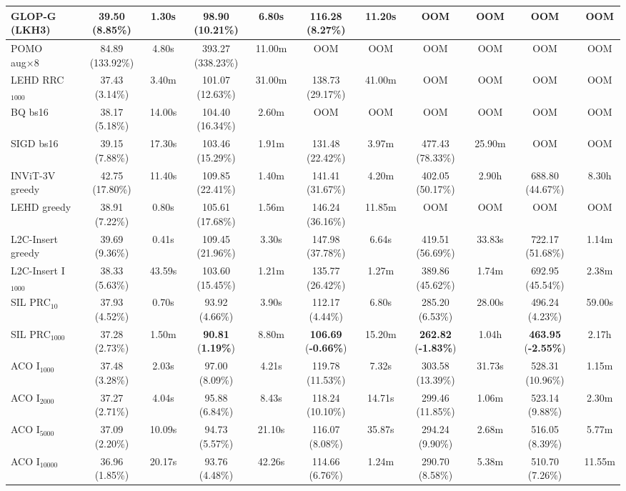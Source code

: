 \documentclass[sigconf]{acmart}
\begin{document}
\begin{table}[t]
{\begin{tabular}{lcccccccccc}
GLOP-G (LKH3) & 39.50 (8.85\%) & 1.30s & 98.90 (10.21\%) & 6.80s & 116.28 (8.27\%) & 11.20s & OOM & OOM & OOM & OOM \\
\midrule
POMO aug×8 & 84.89 (133.92\%) & 4.80s & 393.27 (338.23\%) & 11.00m & OOM & OOM & OOM & OOM & OOM & OOM \\
LEHD RRC$_{1000}$ & 37.43 (3.14\%) & 3.40m & 101.07 (12.63\%) & 31.00m & 138.73 (29.17\%) & 41.00m & OOM & OOM & OOM & OOM \\
BQ bs16 & 38.17 (5.18\%) & 14.00s & 104.40 (16.34\%) & 2.60m & OOM & OOM & OOM & OOM & OOM & OOM \\
SIGD bs16 & 39.15 (7.88\%) & 17.30s & 103.46 (15.29\%) & 1.91m & 131.48 (22.42\%) & 3.97m & 477.43 (78.33\%) & 25.90m & OOM & OOM \\
INViT-3V greedy & 42.75 (17.80\%) & 11.40s & 109.85 (22.41\%) & 1.40m & 141.41 (31.67\%) & 4.20m & 402.05 (50.17\%) & 2.90h & 688.80 (44.67\%) & 8.30h \\
LEHD greedy & 38.91 (7.22\%) & 0.80s & 105.61 (17.68\%) & 1.56m & 146.24 (36.16\%) & 11.85m & OOM & OOM & OOM & OOM \\
L2C-Insert greedy & 39.69 (9.36\%) & 0.41s & 109.45 (21.96\%) & 3.30s & 147.98 (37.78\%) & 6.64s & 419.51 (56.69\%) & 33.83s & 722.17 (51.68\%) & 1.14m \\
L2C-Insert I$_{1000}$ & 38.33 (5.63\%) & 43.59s & 103.60 (15.45\%) & 1.21m & 135.77 (26.42\%) & 1.27m & 389.86 (45.62\%) & 1.74m & 692.95 (45.54\%) & 2.38m \\
SIL PRC$_{10}$ & 37.93 (4.52\%) & 0.70s & 93.92 (4.66\%) & 3.90s & 112.17 (4.44\%) & 6.80s & 285.20 (6.53\%) & 28.00s & 496.24 (4.23\%) & 59.00s \\
SIL PRC$_{1000}$ & 37.28 (2.73\%) & 1.50m & \textbf{90.81} (\textbf{1.19\%}) & 8.80m & \textbf{106.69} (\textbf{-0.66\%}) & 15.20m & \textbf{262.82} (\textbf{-1.83\%}) & 1.04h & \textbf{463.95} (\textbf{-2.55\%}) & 2.17h \\
\midrule
ACO I$_{1000}$ & 37.48 (3.28\%) & 2.03s & 97.00 (8.09\%) & 4.21s & 119.78 (11.53\%) & 7.32s & 303.58 (13.39\%) & 31.73s & 528.31 (10.96\%) & 1.15m \\
ACO I$_{2000}$ & 37.27 (2.71\%) & 4.04s & 95.88 (6.84\%) & 8.43s & 118.24 (10.10\%) & 14.71s & 299.46 (11.85\%) & 1.06m & 523.14 (9.88\%) & 2.30m \\
ACO I$_{5000}$ & 37.09 (2.20\%) & 10.09s & 94.73 (5.57\%) & 21.10s & 116.07 (8.08\%) & 35.87s & 294.24 (9.90\%) & 2.68m & 516.05 (8.39\%) & 5.77m \\
ACO I$_{10000}$ & 36.96 (1.85\%) & 20.17s & 93.76 (4.48\%) & 42.26s & 114.66 (6.76\%) & 1.24m & 290.70 (8.58\%) & 5.38m & 510.70 (7.26\%) & 11.55m \\

\end{tabular}}
\end{table}
\end{document}
